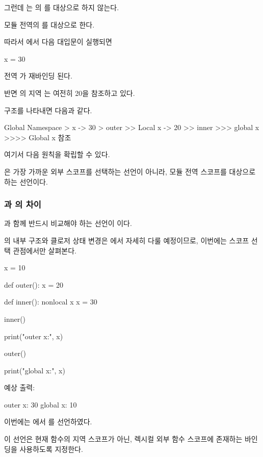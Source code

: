 그런데 는 의 를 대상으로 하지 않는다.

모듈 전역의 를 대상으로 한다.

따라서 에서 다음 대입문이 실행되면

\begin{dhkcode}
x = 30
\end{dhkcode}

전역 가 재바인딩 된다.

반면 의 지역 는 여전히 20을 참조하고 있다.

구조를 나타내면 다음과 같다.

\begin{dhkdir}[in=6]
Global Namespace
> x -> 30
> outer
>> Local x -> 20
>> inner
>>> global x
>>>> Global x 참조
\end{dhkdir}

여기서 다음 원칙을 확립할 수 있다.

은 가장 가까운 외부 스코프를 선택하는 선언이 아니라, 모듈 전역 스코프를 대상으로 하는 선언이다.

\subsubsection{과 의 차이}

과 함께 반드시 비교해야 하는 선언이 이다.

의 내부 구조와 클로저 상태 변경은 에서 자세히 다룰 예정이므로, 이번에는 스코프 선택 관점에서만 살펴본다.

\begin{dhkcode}
x = 10

def outer():
    x = 20

    def inner():
        nonlocal x
        x = 30

    inner()

    print("outer x:", x)

outer()

print("global x:", x)
\end{dhkcode}

예상 출력:

\begin{dhkzsh}
outer x: 30
global x: 10
\end{dhkzsh}

이번에는 에서 를 선언하였다.

이 선언은 현재 함수의 지역 스코프가 아닌, 렉시컬 외부 함수 스코프에 존재하는  바인딩을 사용하도록 지정한다.

